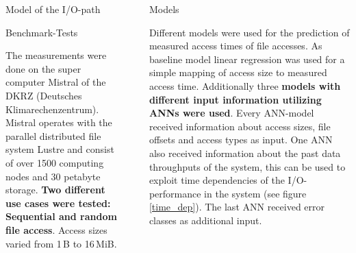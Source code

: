 \documentclass[final]{beamer}
\newlength{\sepwid}
\newlength{\onecolwid}
\begin{document}
\begin{frame}[t]
\begin{columns}[t]
\begin{column}{\onecolwid}
\begin{block}{Model of the I/O-path}
	
	
\end{block}

\vspace*{-2cm}
\begin{block}{Benchmark-Tests}
	
	The measurements were done on the super computer Mistral of the DKRZ (Deutsches Klimarechenzentrum).
	Mistral operates with the parallel distributed file system Lustre and consist of over 1500 computing nodes and 30 petabyte storage.
	\textbf{Two different use cases were tested: Sequential and random file access}.
	Access sizes varied from 1\,B to 16\,MiB.
	
\end{block}
	
\end{column} %

\begin{column}{\sepwid}\end{column} %

\begin{column}{\onecolwid} %
	

\begin{block}{Models}
	
	Different models were used for the prediction of measured access times of file accesses.
	As baseline model linear regression was used for a simple mapping of access size to measured access time.
	Additionally three \textbf{models with different input information utilizing ANNs were used}.
	Every ANN-model received information about access sizes, file offsets and access types as input.
	One ANN also received information about the past data throughputs of the system, this can be used to exploit time dependencies of the I/O-performance in the system (see figure \ref{time_dep}). The last ANN received error classes as additional input.
	

\end{block}
\end{column}
\end{columns}
\end{frame}
\end{document}
